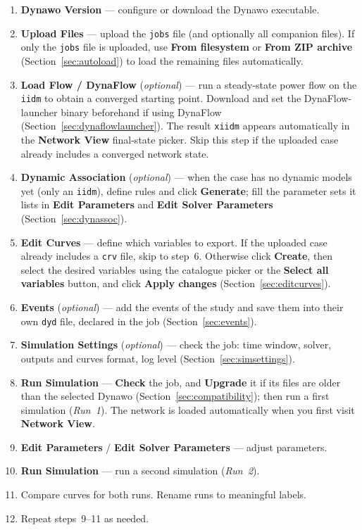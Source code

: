 \documentclass[a4paper,11pt]{article}
\newcommand{\ftype}[1]{\texttt{\small\color{rteblu}#1}}
\begin{document}
\begin{enumerate}[leftmargin=2em]
  \item \textbf{Dynawo Version} --- configure or download the Dynawo executable.
  \item \textbf{Upload Files} --- upload the \ftype{jobs} file (and optionally
    all companion files). If only the \ftype{jobs} file is uploaded, use
    \textbf{From filesystem} or \textbf{From ZIP archive}
    (Section~\ref{sec:autoload}) to load the remaining files automatically.
  \item \textbf{Load Flow / DynaFlow} (\emph{optional}) --- run a steady-state
    power flow on the \ftype{iidm} to obtain a converged starting point.
    Download and set the DynaFlow-launcher binary beforehand if using DynaFlow
    (Section~\ref{sec:dynaflowlauncher}). The result \ftype{xiidm} appears
    automatically in the \textbf{Network View} final-state picker. Skip this
    step if the uploaded case already includes a converged network state.
  \item \textbf{Dynamic Association} (\emph{optional}) --- when the case has
    no dynamic models yet (only an \ftype{iidm}), define rules and click
    \textbf{Generate}; fill the parameter sets it lists in \textbf{Edit
    Parameters} and \textbf{Edit Solver Parameters}
    (Section~\ref{sec:dynassoc}).
  \item \textbf{Edit Curves} --- define which variables to export. If the
    uploaded case already includes a \ftype{crv} file, skip to step~6.
    Otherwise click \textbf{Create}, then select the desired variables using
    the catalogue picker or the \textbf{Select all variables} button, and
    click \textbf{Apply changes} (Section~\ref{sec:editcurves}).
  \item \textbf{Events} (\emph{optional}) --- add the events of the study and
    save them into their own \ftype{dyd} file, declared in the job
    (Section~\ref{sec:events}).
  \item \textbf{Simulation Settings} (\emph{optional}) --- check the job:
    time window, solver, outputs and curves format, log level
    (Section~\ref{sec:simsettings}).
  \item \textbf{Run Simulation} --- \textbf{Check} the job, and
    \textbf{Upgrade} it if its files are older than the selected Dynawo
    (Section~\ref{sec:compatibility}); then run a first simulation
    (\emph{Run~1}). The network is loaded automatically when you first visit
    \textbf{Network View}.
  \item \textbf{Edit Parameters} / \textbf{Edit Solver Parameters} --- adjust
    parameters.
  \item \textbf{Run Simulation} --- run a second simulation (\emph{Run~2}).
  \item Compare curves for both runs. Rename runs to meaningful labels.
  \item Repeat steps~9--11 as needed.
\end{enumerate}
\end{document}
